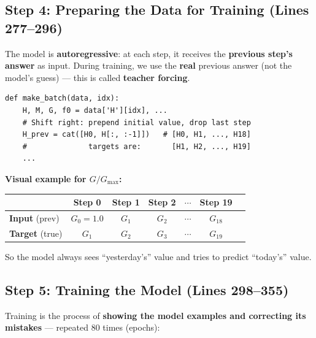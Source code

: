 \documentclass[11pt,a4paper]{article}
\begin{document}
\subsection{Step 4: Preparing the Data for Training (Lines 277--296)}

The model is \textbf{autoregressive}: at each step, it receives the
\textbf{previous step's answer} as input.  During training, we use
the \textbf{real} previous answer (not the model's guess) --- this
is called \textbf{teacher forcing}.

\begin{lstlisting}
def make_batch(data, idx):
    H, M, G, f0 = data['H'][idx], ...
    # Shift right: prepend initial value, drop last step
    H_prev = cat([H0, H[:, :-1]])   # [H0, H1, ..., H18]
    #              targets are:       [H1, H2, ..., H19]
    ...
\end{lstlisting}

\textbf{Visual example for $G/G_{\max}$:}

\begin{center}
\begin{tabular}{lcccccc}
\toprule
           & Step 0 & Step 1 & Step 2 & $\cdots$ & Step 19 \\
\midrule
\textbf{Input}  (prev) & $G_0{=}1.0$ & $G_1$ & $G_2$ & $\cdots$ & $G_{18}$ \\
\textbf{Target} (true) & $G_1$       & $G_2$ & $G_3$ & $\cdots$ & $G_{19}$ \\
\bottomrule
\end{tabular}
\end{center}

So the model always sees ``yesterday's'' value and tries to predict
``today's'' value.


\subsection{Step 5: Training the Model (Lines 298--355)}

Training is the process of \textbf{showing the model examples and
correcting its mistakes} --- repeated 80 times (epochs):
\end{document}
